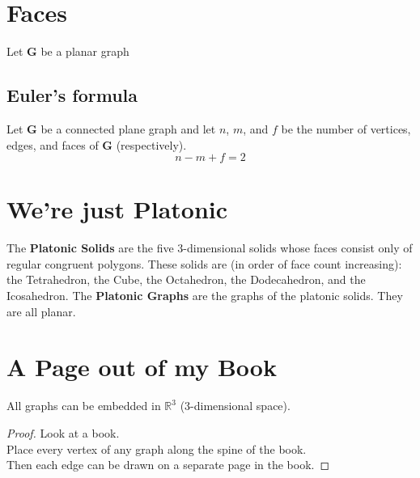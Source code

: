 \section{Faces}
Let \textbf{G} be a planar graph
\subsection{Euler's formula}
Let \textbf{G} be a connected plane graph and let $n$, $m$, and $f$ be the number of vertices, edges, and faces of \textbf{G} (respectively).
\begin{equation*}
	n-m+f=2
\end{equation*}
\section{We're just Platonic}
The \textbf{Platonic Solids} are the five 3-dimensional solids whose faces consist only of regular congruent polygons.\newline
These solids are (in order of face count increasing): the Tetrahedron, the Cube, the Octahedron, the Dodecahedron, and the Icosahedron.\newline %
The \textbf{Platonic Graphs} are the graphs of the platonic solids. They are all planar.
\section{A Page out of my Book}
All graphs can be embedded in $\mathbb{R}^3$ (3-dimensional space).
\begin{proof}
Look at a book.\\
Place every vertex of any graph along the spine of the book.\\
Then each edge can be drawn on a separate page in the book.
\end{proof}
